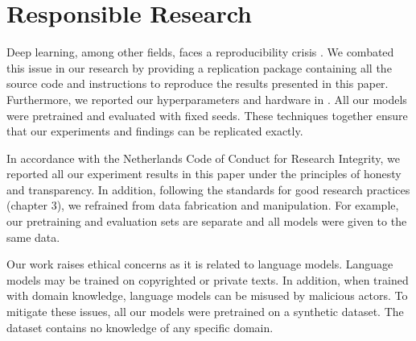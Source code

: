 \section{Responsible Research}
\label{sec:responsible}
Deep learning, among other fields, faces a reproducibility crisis \cite{semmelrock_reproducibility_2023}. We combated this issue in our research by providing a replication package containing all the source code and instructions to reproduce the results presented in this paper. Furthermore, we reported our hyperparameters and hardware in . All our models were pretrained and evaluated with fixed seeds. These techniques together ensure that our experiments and findings can be replicated exactly.

In accordance with the Netherlands Code of Conduct for Research Integrity, we reported all our experiment results in this paper under the principles of honesty and transparency. In addition, following the standards for good research practices (chapter 3), we refrained from data fabrication and manipulation. For example, our pretraining and evaluation sets are separate and all models were given to the same data.

Our work raises ethical concerns as it is related to language models. Language models may be trained on copyrighted or private texts. In addition, when trained with domain knowledge, language models can be misused by malicious actors. To mitigate these issues, all our models were pretrained on a synthetic dataset. The dataset contains no knowledge of any specific domain.

